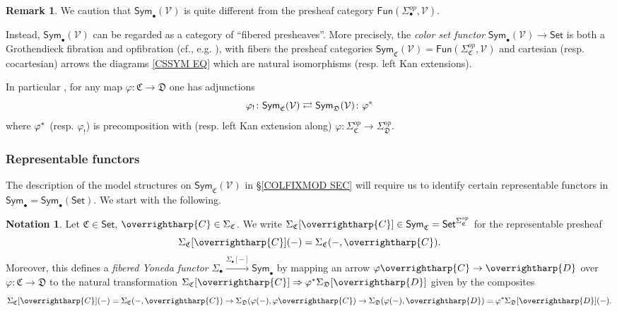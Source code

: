 \documentclass[a4paper,10pt
,draft
]{article}%
\numberwithin{equation}{section}
\numberwithin{figure}{section}
\theoremstyle{definition} %
\newtheorem{remark}[equation]{Remark}%
\newtheorem{notation}[equation]{Notation}%
\newcommand{\vect}[1]{\text{\overrightharp{\ensuremath{#1}}}}
\newcommand{\Sym}{\ensuremath{\mathsf{Sym}}}%
\newcommand{\V}{\ensuremath{\mathcal V}}
\newcommand{\1}{\ensuremath{\mathbbm 1}}%
\begin{document}
\begin{remark}\label{COLCHADJ REM}
	We caution that 
	$\mathsf{Sym}_{\bullet}(\V)$
	is quite different from the presheaf category 
	$\mathsf{Fun}(\Sigma_{\bullet}^{op},\V)$.
	
	Instead,  
	$\mathsf{Sym}_{\bullet}(\V)$
	can be regarded as a category of ``fibered presheaves''.
	More precisely, 
	the \emph{color set functor}
	$\mathsf{Sym}_{\bullet}(\V) \to \mathsf{Set}$
	is both a Grothendieck fibration
	and opfibration
	(cf., e.g. \cite[\S \ref{OC-GROTFIB SEC}]{BP_FCOP}),
	with fibers the 
	presheaf categories
	$\Sym_{\mathfrak C}(\V)=
	\mathsf{Fun}(\Sigma_{\mathfrak{C}}^{op},\mathcal{V})$
	and cartesian (resp. cocartesian)
	arrows the diagrams \eqref{CSSYM EQ}
	which are natural isomorphisms (resp. left Kan extensions).

	In particular \cite[Rem. \ref{OC-ALSOOPADJ REM}]{BP_FCOP},
	for any map $\varphi \colon \mathfrak{C} \to \mathfrak{D}$
	one has adjunctions
	\begin{equation}\label{COLCHADJ EQ}
	\varphi_! \colon \Sym_{\mathfrak C}(\V) 
	\rightleftarrows 
	\Sym_{\mathfrak D}(\V) \colon \varphi^{\**}
	\end{equation}
	where $\varphi^{\**}$
	(resp. $\varphi_!$)
	is precomposition with (resp. left Kan extension along)
	$\varphi\colon 
	\Sigma^{op}_{\mathfrak{C}}
	\to 
	\Sigma^{op}_{\mathfrak{D}}$.
\end{remark}




\subsubsection*{Representable functors}

The description of the model structures 
on $\Sym_{\mathfrak C}(\V) $ in 
\S \ref{COLFIXMOD SEC}
will require us to identify certain
representable functors in 
$\mathsf{Sym}_{\bullet} = \mathsf{Sym}_{\bullet}(\mathsf{Set})$.
We start with the following.


\begin{notation}\label{FIBYON NOT}
Let $\mathfrak{C} \in \mathsf{Set}$, $\vect{C} \in \Sigma_{\mathfrak{C}}$.
We write
$\Sigma_{\mathfrak{C}}[\vect{C}] 
\in \mathsf{Sym}_{\mathfrak{C}} = \mathsf{Set}^{\Sigma_{\mathfrak{C}}^{op}}$ for the representable presheaf
\[\Sigma_{\mathfrak{C}}[\vect{C}](-)
= \Sigma_{\mathfrak{C}}(-,\vect{C}).\]
Moreover, this defines a 
\emph{fibered Yoneda functor}
$
\Sigma_{\bullet} \xrightarrow{\Sigma_{\bullet}[-]} \mathsf{Sym}_{\bullet}
$
by mapping an arrow
$\varphi \vect{C} \to \vect{D}$
over $\varphi \colon \mathfrak{C} \to \mathfrak{D}$
to the natural transformation 
$\Sigma_{\mathfrak{C}}[\vect{C}]
\Rightarrow
\varphi^{\**}
\Sigma_{\mathfrak{D}}[\vect{D}]
$ given by the composites
\[\Sigma_{\mathfrak{C}}[\vect{C}](-)
= \Sigma_{\mathfrak{C}}(-,\vect{C})
\to 
\Sigma_{\mathfrak{D}}(\varphi(-),\varphi\vect{C})
\to
\Sigma_{\mathfrak{D}}(\varphi(-),\vect{D})
=
\varphi^{\**} \Sigma_{\mathfrak{D}}[\vect{D}](-).
\]
\end{notation}
\end{document}
